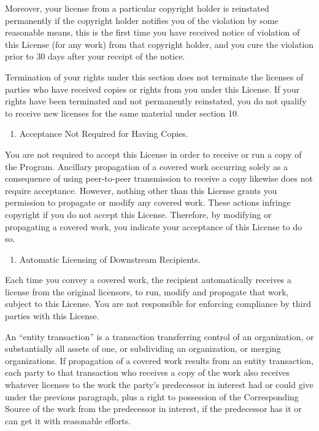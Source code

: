 \documentclass[letterpaper,10pt,english]{sphinxmanual}
\begin{document}
Moreover, your license from a particular copyright holder is
reinstated permanently if the copyright holder notifies you of the
violation by some reasonable means, this is the first time you have
received notice of violation of this License (for any work) from that
copyright holder, and you cure the violation prior to 30 days after
your receipt of the notice.

Termination of your rights under this section does not terminate the
licenses of parties who have received copies or rights from you under
this License.  If your rights have been terminated and not permanently
reinstated, you do not qualify to receive new licenses for the same
material under section 10.
\begin{enumerate}
%
\setcounter{enumi}{8}
\item {} 
Acceptance Not Required for Having Copies.

\end{enumerate}

You are not required to accept this License in order to receive or
run a copy of the Program.  Ancillary propagation of a covered work
occurring solely as a consequence of using peer-to-peer transmission
to receive a copy likewise does not require acceptance.  However,
nothing other than this License grants you permission to propagate or
modify any covered work.  These actions infringe copyright if you do
not accept this License.  Therefore, by modifying or propagating a
covered work, you indicate your acceptance of this License to do so.
\begin{enumerate}
%
\setcounter{enumi}{9}
\item {} 
Automatic Licensing of Downstream Recipients.

\end{enumerate}

Each time you convey a covered work, the recipient automatically
receives a license from the original licensors, to run, modify and
propagate that work, subject to this License.  You are not responsible
for enforcing compliance by third parties with this License.

An “entity transaction” is a transaction transferring control of an
organization, or substantially all assets of one, or subdividing an
organization, or merging organizations.  If propagation of a covered
work results from an entity transaction, each party to that
transaction who receives a copy of the work also receives whatever
licenses to the work the party’s predecessor in interest had or could
give under the previous paragraph, plus a right to possession of the
Corresponding Source of the work from the predecessor in interest, if
the predecessor has it or can get it with reasonable efforts.
\end{document}
